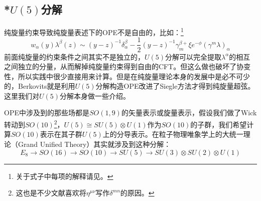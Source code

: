 \subsection{*$U(5)$分解}
纯旋量约束导致纯旋量表述下的OPE不是自由的，比如：\footnote{关于式子中每项的解释请见\cite{Berkovits:2000fe}。}
\begin{equation}
	w_\alpha(y)\lambda^\beta(z)\sim(y-z)^{-1}\delta_\alpha^\beta-\frac{1}{2}(y-z)^{-1}\gamma_m^{\beta+}\xi e^{-\phi}(\gamma^m\lambda)_\alpha
\end{equation}
前面纯旋量的约束条件之间其实不是独立的，$U(5)$分解可以完全提取$\lambda^\alpha$的相互之间独立的分量，从而解掉纯旋量约束得到自由的CFT。但这么做也破坏了协变性，所以实践中很少直接用来计算。但是在纯旋量理论本身的发展中是必不可少的，Berkovits就是利用$U(5)$分解构造OPE改进了Siegle方法才得到纯旋量超弦。这里我们对$U(5)$分解本身做一些介绍。

OPE中涉及到的那些场都是$SO(1,9)$的矢量表示或旋量表示，假设我们做了Wick转动到$SO(10)$\footnote{这也是不少文献喜欢将$\eta^{\mu\nu}$写作$\delta^{mn}$的原因。}，$U(5)\cong SU(5)\otimes U(1)$作为$SO(10)$的子群，我们希望计算$SO(10)$表示在其子群$U(5)$上的分导表示。在粒子物理唯象学上的大统一理论（Grand Unified Theory）其实就涉及到这种分解：\cite{Georgi:2000vve,Zee:2016fuk}
\begin{equation}
	E_8\to SO(16)\to SO(10)\to SU(5)\to SU(3)\otimes SU(2)\otimes U(1)
\end{equation}

